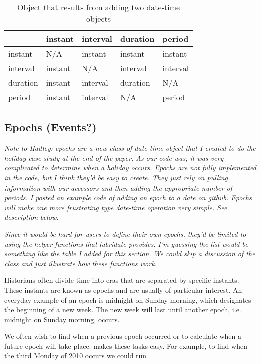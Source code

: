 \documentclass[article]{jss}
\begin{document}
\begin{table}
  \begin{center}
  \begin{tabular}{l|llll}
  & instant & interval & duration & period\\
  \hline
  instant & N/A & instant & instant & instant\\
  interval & instant & N/A & interval & interval\\
  duration & instant & interval & duration & N/A\\
  period & instant & interval & N/A & period\\
  \hline
    
  \end{tabular}
  \end{center}
  \caption{Object that results from adding two date-time objects}
  \label{tbl:date-math}
\end{table}

\subsection{Epochs (Events?)}
\emph{Note to Hadley: epochs are a new class of date time object that I created to do the holiday case study at the end of the paper.  As our code was, it was very complicated to determine when a holiday occurs. Epochs are not fully implemented in the code, but I think they'd be easy to create. They just rely on pulling information with our accessors and then adding the appropriate number of periods. I posted an example code of adding an epoch to a date on github. Epochs will make one more frustrating type date-time operation very simple. See description below.}

\emph{Since it would be hard for users to define their own epochs, they'd be limited to using the helper functions that lubridate provides. I'm guessing the list would be something like the table I added for this section. We could skip a discussion of the class and just illustrate how these functions work.}

Historians often divide time into eras that are separated by specific instants. These instants are known as epochs and are usually of particular interest. An everyday example of an epoch is midnight on Sunday morning, which designates the beginning of a new week. The new week will last until another epoch, i.e. midnight on Sunday morning, occurs. 

We often wish to find when a previous epoch occurred or to calculate when a future epoch will take place.  makes these tasks easy. For example, to find when the third Monday of 2010 occurs we could run\\
\end{document}
